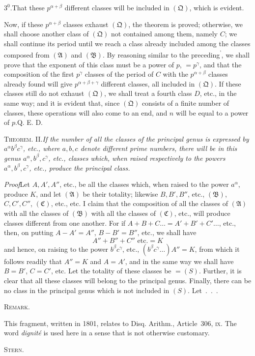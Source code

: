 $3^0$.\quad That these $p^{\alpha+\beta}$ different classes will be included in $(\mathfrak Q)$, which is evident.

Now, if these $p^{\alpha+\beta}$ classes exhaust $(\mathfrak Q)$, the theorem is proved; otherwise, we shall choose another class of $(\mathfrak Q)$ not contained among them, namely $C$; we shall continue its period until we reach a class already included among the classes composed from $(\mathfrak A)$ and $(\mathfrak B)$. By reasoning similar to the preceding\textsuperscript{'}, we shall prove that the exponent of this class must be a power of $p$, $=p^\gamma$, and that the composition of the first $p^\gamma$ classes of the period of $C$ with the $p^{\alpha+\beta}$ classes already found will give $p^{\alpha+\beta+\gamma}$ different classes, all included in $(\mathfrak Q)$. If these classes still do not exhaust $(\mathfrak Q)$, we shall treat a fourth class $D$, etc., in the same way; and it is evident that, since $(\mathfrak Q)$ consists of a finite number of classes, these operations will also come to an end, and $n$ will be equal to a power of $p$.\quad Q. E. D.

\par\bigskip
{}
\textsc{Theorem. II.}\quad\emph{If the number of all the classes of the principal genus is expressed by $a^\alpha b^\beta c^\gamma$, etc., where $a,b,c$ denote different prime numbers, there will be in this genus $a^\alpha,b^\beta,c^\gamma$, etc., classes which, when raised respectively to the powers $a^\alpha,b^\beta,c^\gamma$, etc., produce the principal class.}

\emph{Proof}\quad Let $A,A',A''$, etc., be all the classes which, when raised to the power $a^\alpha$, produce $K$, and let $(\mathfrak A)$ be their totality; likewise $B,B',B''$, etc., $(\mathfrak B)$, $C,C',C''$, $(\mathfrak C)$, etc., etc. I claim that the composition of all the classes of $(\mathfrak A)$ with all the classes of $(\mathfrak B)$ with all the classes of $(\mathfrak C)$, etc., will produce classes different from one another. For if $A+B+C\dots=A'+B'+C'\dots$, etc., then, on putting $A-A'=A''$, $B-B'=B''$, etc., we shall have
\[
A''+B''+C''\text{ etc.}=K
\]
and hence, on raising to the power $b^\beta c^\gamma$, etc., $(b^\beta c^\gamma\dots)A''=K$, from which it follows readily that
$A''=K$ and $A=A'$, and in the same way we shall have $B=B'$, $C=C'$, etc. Let the totality of these classes be $=(S)$. Further, it is clear that all these classes will belong to the principal genus. Finally, there can be no class in the principal genus which is not included in $(S)$. Let\ .\ .\ .

\par\bigskip
{}
\begin{center}\textsc{Remark.}\end{center}
\begingroup\small
This fragment, written in 1801, relates to Disq. Arithm., Article~306, \textsc{ix}. The word \emph{dignité} is used here in a sense that is not otherwise customary.
\begin{flushright}\textsc{Stern}.\end{flushright}
\endgroup
{}
